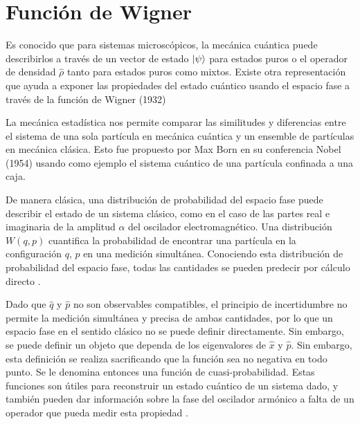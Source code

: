\chapter{Función de Wigner}

Es conocido que para sistemas microscópicos, la mecánica cuántica puede describirlos a través de un vector de estado $\ket{\psi}$ para estados puros o el operador de densidad $\hat{\rho}$ tanto para estados puros como mixtos. Existe otra representación que ayuda a exponer las propiedades del estado cuántico usando el espacio fase a través de la función de Wigner (1932)

La mecánica estadística nos permite comparar las similitudes y diferencias entre el sistema de una sola partícula en mecánica cuántica y un ensemble de partículas en mecánica clásica. Esto fue propuesto por Max Born en su conferencia Nobel (1954) usando como ejemplo el sistema cuántico de una partícula confinada a una caja.

De manera clásica, una distribución de probabilidad del espacio fase puede describir el estado de un sistema clásico, como en el caso de las partes real e imaginaria de la amplitud $\alpha$ del oscilador electromagnético. Una distribución $W(q,p)$ cuantifica la probabilidad de encontrar una partícula en la configuración $q$, $p$ en una medición simultánea. Conociendo esta distribución de probabilidad del espacio fase, todas las cantidades se pueden predecir por cálculo directo \cite{Leonhardt}.

Dado que $\hat{q}$ y $\hat{p}$ no son observables compatibles, el principio de incertidumbre no permite la medición simultánea y precisa de ambas cantidades, por lo que un espacio fase en el sentido clásico no se puede definir directamente. Sin embargo, se puede definir un objeto que dependa de los eigenvalores de $\hat{x}$ y $\hat{p}$. Sin embargo, esta definición se realiza sacrificando que la función sea no negativa en todo punto. Se le denomina entonces una función de cuasi-probabilidad. Estas funciones son útiles para reconstruir un estado cuántico de un sistema dado, y también pueden dar información sobre la fase del oscilador armónico a falta de un operador que pueda medir esta propiedad \cite{Moya}.

